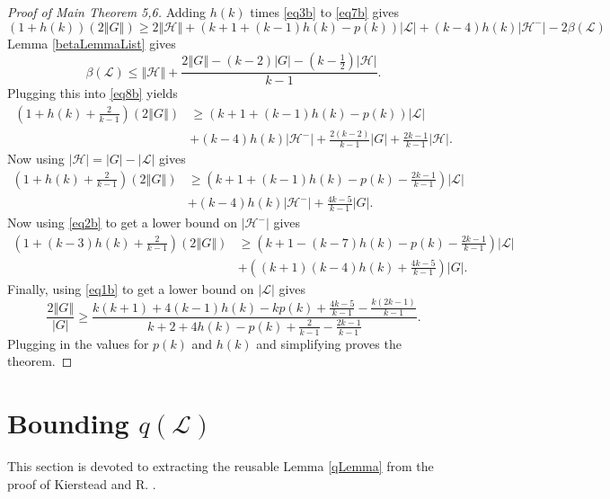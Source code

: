 \documentclass[10pt]{article}
\theoremstyle{plain}
\theoremstyle{definition}
\theoremstyle{remark}
\newcommand{\fancy}[1]{\mathcal{#1}}
\renewcommand{\L}{\fancy{L}}
\newcommand{\HH}{\fancy{H}}
\newcommand{\card}[1]{\left|#1\right|}
\newcommand{\size}[1]{\left\Vert#1\right\Vert}
\newcommand{\parens}[1]{\left( #1 \right)}
\begin{document}
\begin{proof}[Proof of Main Theorem 5,6]
Adding $h(k)$ times \eqref{eq3b} to \eqref{eq7b} gives
\begin{equation}\label{eq8b}
\parens{1 + h(k)}(2\size{G}) \ge 2\size{\HH} + \parens{k+1 +(k-1)h(k)- p(k)}\card{\L} + (k- 4)h(k)\card{\HH^-}  - 2\beta(\L)
\end{equation}
Lemma \ref{betaLemmaList} gives
\[\beta(\L) \le \size{\HH} + \frac{2\size{G} - (k-2)\card{G} - \parens{k - \frac12}\card{\HH}}{k-1}.\]
Plugging this into \eqref{eq8b} yields
\begin{equation}\label{eq9b}
\begin{align*}
\parens{1 + h(k) + \frac{2}{k-1}}(2\size{G}) &\ge \parens{k+1 +(k-1)h(k)- p(k)}\card{\L}\\ 
&+ (k- 4)h(k)\card{\HH^-} +\frac{2(k-2)}{k-1}\card{G} + \frac{2k-1}{k-1}\card{\HH}.
\end{align*}
\end{equation}
Now using $\card{\HH} = \card{G} - \card{\L}$ gives
\begin{equation}\label{eq10b}
\begin{align*}
\parens{1 + h(k) + \frac{2}{k-1}}(2\size{G}) &\ge \parens{k+1 +(k-1)h(k)- p(k) - \frac{2k-1}{k-1}}\card{\L}\\ 
&+ (k- 4)h(k)\card{\HH^-} +\frac{4k-5}{k-1}\card{G}.
\end{align*}
\end{equation}
Now using \eqref{eq2b} to get a lower bound on $\card{\HH^-}$ gives
\begin{equation}\label{eq11b}
\begin{align*}
\parens{1 + (k-3)h(k) + \frac{2}{k-1}}(2\size{G}) &\ge \parens{k+1 - (k-7)h(k)- p(k) - \frac{2k-1}{k-1}}\card{\L}\\ 
&+\parens{(k+1)(k-4)h(k) + \frac{4k-5}{k-1}}\card{G}.
\end{align*}
\end{equation}
Finally, using \eqref{eq1b} to get a lower bound on $\card{\L}$ gives
\begin{equation}\label{eq12b}
\frac{2\size{G}}{\card{G}} \ge \frac{k(k+1) + 4(k-1)h(k) - kp(k) + \frac{4k-5}{k-1} - \frac{k(2k-1)}{k-1}}{k+2 + 4h(k) - p(k) + \frac{2}{k-1}- \frac{2k-1}{k-1}}.
\end{equation}
Plugging in the values for $p(k)$ and $h(k)$ and simplifying proves the theorem.
\end{proof}

\section{Bounding $q(\L)$}
This section is devoted to extracting the reusable Lemma \ref{qLemma} from the proof of Kierstead and R. \cite{OreVizing}.
\end{document}
